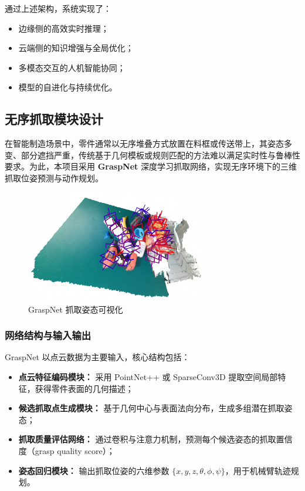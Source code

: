 \documentclass{cumcmthesis}
\begin{document}
通过上述架构，系统实现了：
\begin{itemize}
    \item 边缘侧的高效实时推理；
    \item 云端侧的知识增强与全局优化；
    \item 多模态交互的人机智能协同；
    \item 模型的自进化与持续优化。
\end{itemize}

\subsection{无序抓取模块设计}

在智能制造场景中，零件通常以无序堆叠方式放置在料框或传送带上，其姿态多变、部分遮挡严重，传统基于几何模板或规则匹配的方法难以满足实时性与鲁棒性要求。为此，本项目采用 \textbf{GraspNet} 深度学习抓取网络，实现无序环境下的三维抓取位姿预测与动作规划。

\begin{figure}[htbp]\centering
\includegraphics[width=0.7\textwidth]{graspnet.png}
\caption{GraspNet 抓取姿态可视化}\label{fig:grasp_viz}
\end{figure}
\subsubsection{网络结构与输入输出}

GraspNet 以点云数据为主要输入，核心结构包括：
\begin{itemize}
    \item \textbf{点云特征编码模块：} 采用 PointNet++ \cite{qi2017pointnet++} 或 SparseConv3D 提取空间局部特征，获得零件表面的几何描述；
    \item \textbf{候选抓取点生成模块：} 基于几何中心与表面法向分布，生成多组潜在抓取姿态；
    \item \textbf{抓取质量评估网络：} 通过卷积与注意力机制，预测每个候选姿态的抓取置信度（grasp quality score）；
    \item \textbf{姿态回归模块：} 输出抓取位姿的六维参数 $\{x, y, z, \theta, \phi, \psi\}$，用于机械臂轨迹规划。
\end{itemize}
\end{document}

